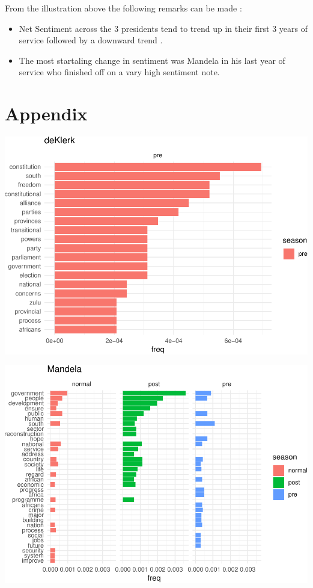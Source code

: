 \documentclass[]{article}
\begin{document}
From the illustration above the following remarks can be made :

\begin{itemize}
\item Net Sentiment across the 3 presidents tend to trend up in their first 3 years of service followed by a downward trend .
\item The most startaling change in sentiment was Mandela in his last year of service who finished off on a vary high sentiment note.
\end{itemize}

\section{Appendix}\label{appendix}

\begin{center}\includegraphics{datasci_fi_Assignment_2_files/figure-latex/deKlerk -1} \end{center}

\begin{center}\includegraphics{datasci_fi_Assignment_2_files/figure-latex/mandela -1} \end{center}
\end{document}
